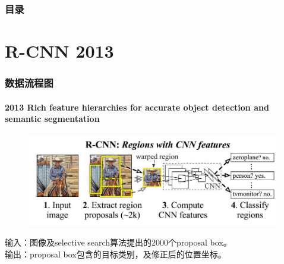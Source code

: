 \documentclass{beamer}
\date{2017 11}
\begin{document}
    
    
    \begin{frame}
        \frametitle{目录}
        \tableofcontents
    \end{frame}
    
    
    \section{R-CNN 2013}
    
    \begin{frame}
        \frametitle{数据流程图}
        \framesubtitle{2013 Rich feature hierarchies for accurate object detection and semantic segmentation}
        \begin{figure}
            \centering
            \includegraphics[height=4cm]{../graphic/rcnnflow.jpg}
        \end{figure}
        输入：图像及selective search算法提出的2000个proposal box。  \\
        输出：proposal box包含的目标类别，及修正后的位置坐标。  \\
    \end{frame}
    
\end{document}
